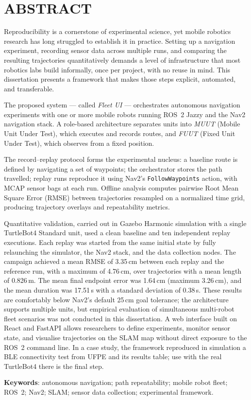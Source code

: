 \chapter*{ABSTRACT}

Reproducibility is a cornerstone of experimental science, yet mobile robotics research
has long struggled to establish it in practice. Setting up a navigation experiment,
recording sensor data across multiple runs, and comparing the resulting trajectories
quantitatively demands a level of infrastructure that most robotics labs build informally,
once per project, with no reuse in mind. This dissertation presents a framework that
makes those steps explicit, automated, and transferable.

The proposed system --- called \textit{Fleet UI} --- orchestrates autonomous navigation
experiments with one or more mobile robots running ROS~2 Jazzy and the Nav2 navigation
stack. A role-based architecture separates units into \textit{MUUT} (Mobile Unit Under
Test), which executes and records routes, and \textit{FUUT} (Fixed Unit Under Test),
which observes from a fixed position.

The record--replay protocol forms the experimental nucleus: a baseline route is defined
by navigating a set of waypoints; the orchestrator stores the path travelled; replay
runs reproduce it using Nav2's \texttt{FollowWaypoints} action, with MCAP sensor bags
at each run. Offline analysis computes pairwise Root Mean Square Error (RMSE) between
trajectories resampled on a normalized time grid, producing trajectory overlays and
repeatability metrics.

Quantitative validation, carried out in Gazebo Harmonic simulation with a single
TurtleBot4 Standard unit, used a clean baseline and ten independent replay executions.
Each replay was started from the same initial state by fully relaunching the simulator,
the Nav2 stack, and the data collection nodes. The campaign achieved a mean RMSE of
3.35\,cm between each replay and the reference run, with a maximum of 4.76\,cm, over
trajectories with a mean length of 0.826\,m. The mean final endpoint error was
1.64\,cm (maximum 3.26\,cm), and the mean duration was 17.51\,s with a standard
deviation of 0.38\,s. These results are comfortably below Nav2's default 25\,cm goal
tolerance; the architecture supports multiple units, but empirical evaluation of
simultaneous multi-robot fleet scenarios was not conducted in this dissertation. A web
interface built on React and FastAPI allows researchers to define experiments, monitor
sensor state, and visualise trajectories on the SLAM map without direct exposure to the
ROS~2 command line. In a case study, the framework reproduced in simulation a BLE
connectivity test from UFPE and its results table; use with the real TurtleBot4 there
is the final step.

\vspace{0.5cm}
\noindent\textbf{Keywords}: autonomous navigation; path repeatability; mobile robot fleet;
ROS~2; Nav2; SLAM; sensor data collection; experimental framework.
